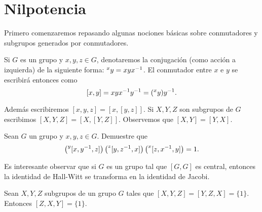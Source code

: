 \chapter{Nilpotencia}

Primero comenzaremos repasando algunas nociones básicas sobre conmutadores y subgrupos generados por conmutadores. 

Si $G$ es un grupo y $x,y,z\in G$, denotaremos la conjugación (como acción
a izquierda) de la siguiente forma: $\prescript{x}{}y=xyx^{-1}$. El
conmutador entre $x$ e $y$ se escribirá entonces como
\[
[x,y]=xyx^{-1}y^{-1}=(\prescript{x}{}y)y^{-1}.
\]

Además escribiremos 
$[x,y,z]=[x,[y,z]]$. Si $X,Y,Z$ son subgrupos de $G$ escribimos
$[X,Y,Z]=\left[ X,[Y,Z] \right]$. Observemos que $[X,Y]=[Y,X]$. 


\begin{exercise}
	\label{exercise:HallWitt}
	Sean $G$ un grupo y $x,y,z\in G$. Demuestre que 
	\begin{equation}
		\label{eq:HallWitt}
	\left(\prescript{y}{}[x,y^{-1},z]\right)\left(\prescript{z}{}[y,z^{-1},x]\right)\left(\prescript{x}{}[z,x^{-1},y]\right)=1.
	\end{equation}
\end{exercise}

Es interesante observar que si $G$ es un grupo tal que $[G,G]$ es central,
entonces la identidad de Hall-Witt se transforma en la identidad de Jacobi.

\begin{lemma}
	\label{lemma:3subgrupos}
	Sean $X,Y,Z$ subgrupos de un grupo $G$ tales que $[X,Y,Z]=[Y,Z,X]=\{1\}$.
	Entonces $[Z,X,Y]=\{1\}$.
\end{lemma}

